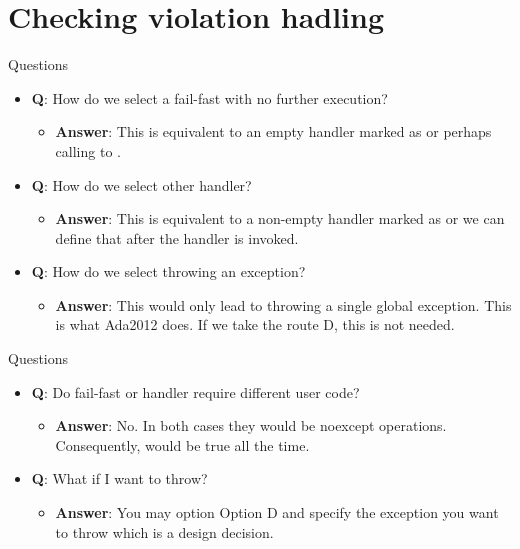 \section{Checking violation hadling}

\begin{frame}[t]{Questions}
\begin{itemize}
  \item \textbf{Q}:
        How do we select a fail-fast with no further execution?
    \begin{itemize}
      \item \textbf{Answer}:
            This is equivalent to an empty handler marked as \cppkey{[[noreturn]]} or perhaps calling to .
    \end{itemize}

  \vfill\pause
  \item \textbf{Q}:
        How do we select other handler?
    \begin{itemize}
      \item \textbf{Answer}:
      This is equivalent to a non-empty handler marked as \cppkey{[[noreturn]]} or we can define that after the handler  is invoked.
    \end{itemize}

  \vfill\pause
  \item \textbf{Q}:
        How do we select throwing an exception?
    \begin{itemize}
      \item \textbf{Answer}:
            This would only lead to throwing a single global exception. This is what Ada2012 does. If we take the route D, this is not needed.
    \end{itemize}
\end{itemize}
\end{frame}

\begin{frame}[t]{Questions}
\begin{itemize}
  \item \textbf{Q}:
        Do fail-fast or handler require different user code?
    \begin{itemize}
      \item \textbf{Answer}:
            No. In both cases they would be noexcept operations. Consequently,  would be true all the time.
    \end{itemize}

  \vfill\pause
  \item \textbf{Q}:
        What if I want to throw?
    \begin{itemize}
      \item \textbf{Answer}:
            You may option Option D and specify the exception you want to throw which is a design decision.
    \end{itemize}
\end{itemize}
\end{frame}
